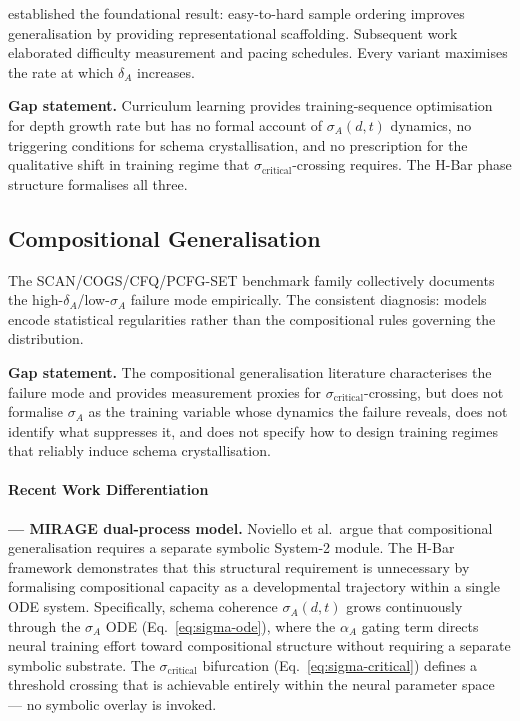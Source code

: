 \documentclass[11pt,a4paper]{article}
\begin{document}
\cite{bengio2009curriculumlearning} established the foundational result:
easy-to-hard sample ordering improves generalisation by providing
representational scaffolding. Subsequent work elaborated difficulty
measurement \citep{kumar2010selfpacedlearning,portelas2020automaticcurriculumlearningdeep,
narvekar2020curriculumlearningreinforcementlearning} and pacing schedules.
Every variant maximises the rate at which $\delta_A$ increases.

\textbf{Gap statement.} Curriculum learning provides training-sequence
optimisation for depth growth rate but has no formal account of
$\sigma_A(d,t)$ dynamics, no triggering conditions for schema
crystallisation, and no prescription for the qualitative shift in
training regime that $\sigma_{\text{critical}}$-crossing requires. The
H-Bar phase structure formalises all three.

\subsection{Compositional Generalisation}\label{sec:compositional-generalisation}

The SCAN/COGS/CFQ/PCFG-SET benchmark family collectively documents the
high-$\delta_A$/low-$\sigma_A$ failure mode empirically. The consistent
diagnosis: models encode statistical regularities rather than the
compositional rules governing the distribution.

\textbf{Gap statement.} The compositional generalisation literature
characterises the failure mode and provides measurement proxies for
$\sigma_{\text{critical}}$-crossing, but does not formalise $\sigma_A$
as the training variable whose dynamics the failure reveals, does not
identify what suppresses it, and does not specify how to design training
regimes that reliably induce schema crystallisation.

\paragraph{Recent Work Differentiation}

\textbf{\cite{noviello2025neuroscienceinspiredualprocess} --- MIRAGE dual-process model.}
Noviello et al.\ argue that compositional generalisation requires a
separate symbolic System-2 module. The H-Bar framework demonstrates that
this structural requirement is unnecessary by formalising compositional
capacity as a developmental trajectory within a single ODE system.
Specifically, schema coherence $\sigma_A(d,t)$ grows continuously
through the $\sigma_A$ ODE (Eq.~\ref{eq:sigma-ode}), where the
$\alpha_A$ gating term directs neural training effort toward
compositional structure without requiring a separate symbolic substrate.
The $\sigma_{\text{critical}}$ bifurcation (Eq.~\ref{eq:sigma-critical})
defines a threshold crossing that is achievable entirely within the
neural parameter space --- no symbolic overlay is invoked.
\end{document}
